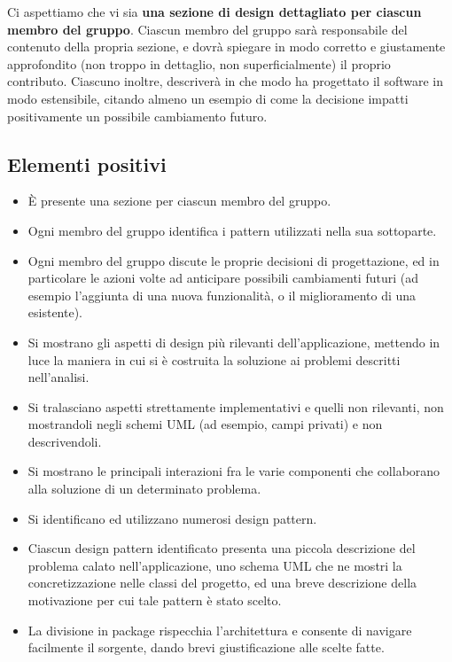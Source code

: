 \documentclass[a4paper,12pt]{report}
\begin{document}
Ci aspettiamo che vi sia \textbf{una sezione di design dettagliato per ciascun membro del gruppo}.
%
Ciascun membro del gruppo sarà responsabile del contenuto della propria sezione, e dovrà spiegare in modo corretto e giustamente approfondito (non troppo in dettaglio, non superficialmente) il proprio contributo.
%
Ciascuno inoltre, descriverà in che modo ha progettato il software in modo estensibile, citando almeno un esempio di come la decisione impatti positivamente un possibile cambiamento futuro.

\subsection*{Elementi positivi}

\begin{itemize}
	\item È presente una sezione per ciascun membro del gruppo.
	\item Ogni membro del gruppo identifica i pattern utilizzati nella sua sottoparte.
	\item Ogni membro del gruppo discute le proprie decisioni di progettazione, ed in particolare le azioni volte ad anticipare possibili cambiamenti futuri (ad esempio l'aggiunta di una nuova funzionalità, o il miglioramento di una esistente).
	\item Si mostrano gli aspetti di design più rilevanti dell'applicazione, mettendo in luce la maniera in cui si è costruita la soluzione ai problemi descritti nell'analisi.
	\item Si tralasciano aspetti strettamente implementativi e quelli non rilevanti, non mostrandoli negli schemi UML (ad esempio, campi privati) e non descrivendoli.
	\item Si mostrano le principali interazioni fra le varie componenti che collaborano alla soluzione di un determinato problema.
	\item Si identificano ed utilizzano numerosi design pattern.
	\item Ciascun design pattern identificato presenta una piccola descrizione del problema calato nell'applicazione, uno schema UML che ne mostri la concretizzazione nelle classi del progetto, ed una breve descrizione della motivazione per cui tale pattern è stato scelto.
	\item La divisione in package rispecchia l'architettura e consente di navigare facilmente il sorgente, dando brevi giustificazione alle scelte fatte.
\end{itemize}
\end{document}
